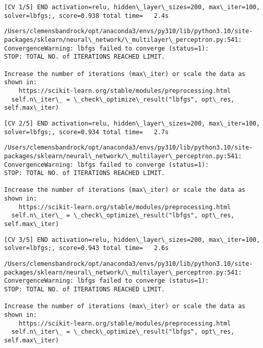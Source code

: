 \documentclass[11pt]{article}
\begin{document}
    \begin{Verbatim}[commandchars=\\\{\}]
[CV 1/5] END activation=relu, hidden\_layer\_sizes=200, max\_iter=100,
solver=lbfgs;, score=0.938 total time=   2.4s
    \end{Verbatim}

    \begin{Verbatim}[commandchars=\\\{\}]
/Users/clemensbandrock/opt/anaconda3/envs/py310/lib/python3.10/site-
packages/sklearn/neural\_network/\_multilayer\_perceptron.py:541:
ConvergenceWarning: lbfgs failed to converge (status=1):
STOP: TOTAL NO. of ITERATIONS REACHED LIMIT.

Increase the number of iterations (max\_iter) or scale the data as shown in:
    https://scikit-learn.org/stable/modules/preprocessing.html
  self.n\_iter\_ = \_check\_optimize\_result("lbfgs", opt\_res, self.max\_iter)
    \end{Verbatim}

    \begin{Verbatim}[commandchars=\\\{\}]
[CV 2/5] END activation=relu, hidden\_layer\_sizes=200, max\_iter=100,
solver=lbfgs;, score=0.934 total time=   2.7s
    \end{Verbatim}

    \begin{Verbatim}[commandchars=\\\{\}]
/Users/clemensbandrock/opt/anaconda3/envs/py310/lib/python3.10/site-
packages/sklearn/neural\_network/\_multilayer\_perceptron.py:541:
ConvergenceWarning: lbfgs failed to converge (status=1):
STOP: TOTAL NO. of ITERATIONS REACHED LIMIT.

Increase the number of iterations (max\_iter) or scale the data as shown in:
    https://scikit-learn.org/stable/modules/preprocessing.html
  self.n\_iter\_ = \_check\_optimize\_result("lbfgs", opt\_res, self.max\_iter)
    \end{Verbatim}

    \begin{Verbatim}[commandchars=\\\{\}]
[CV 3/5] END activation=relu, hidden\_layer\_sizes=200, max\_iter=100,
solver=lbfgs;, score=0.943 total time=   2.6s
    \end{Verbatim}

    \begin{Verbatim}[commandchars=\\\{\}]
/Users/clemensbandrock/opt/anaconda3/envs/py310/lib/python3.10/site-
packages/sklearn/neural\_network/\_multilayer\_perceptron.py:541:
ConvergenceWarning: lbfgs failed to converge (status=1):
STOP: TOTAL NO. of ITERATIONS REACHED LIMIT.

Increase the number of iterations (max\_iter) or scale the data as shown in:
    https://scikit-learn.org/stable/modules/preprocessing.html
  self.n\_iter\_ = \_check\_optimize\_result("lbfgs", opt\_res, self.max\_iter)
    \end{Verbatim}
\end{document}
